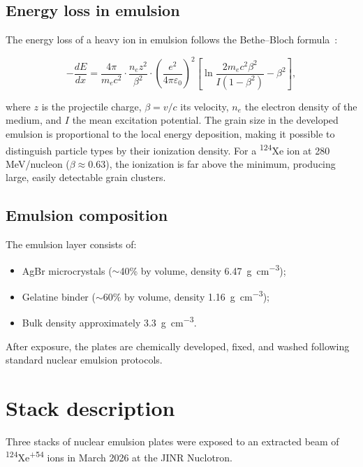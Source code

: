 \documentclass[12pt,a4paper]{article}
\begin{document}
\subsection{Energy loss in emulsion}

The energy loss of a heavy ion in emulsion follows the
Bethe--Bloch formula~\cite{bethe1930}:

\[
-\frac{dE}{dx} = \frac{4\pi}{m_e c^2}\cdot
\frac{n_e z^2}{\beta^2}\cdot
\left(\frac{e^2}{4\pi\varepsilon_0}\right)^{\!2}
\left[\ln\frac{2m_e c^2\beta^2}{I(1-\beta^2)} - \beta^2\right],
\]

\noindent where $z$ is the projectile charge, $\beta = v/c$ its
velocity, $n_e$ the electron density of the medium, and $I$ the mean
excitation potential. The grain size in the developed emulsion is
proportional to the local energy deposition, making it possible to
distinguish particle types by their ionization density. For a
\textsuperscript{124}Xe ion at 280\,MeV/nucleon ($\beta \approx 0.63$),
the ionization is far above the minimum, producing large, easily
detectable grain clusters.

\subsection{Emulsion composition}

The emulsion layer consists of:
\begin{itemize}
  \item AgBr microcrystals ($\sim$40\% by volume, density
        \SI{6.47}{\g\per\cm\cubed});
  \item Gelatine binder ($\sim$60\% by volume, density
        \SI{1.16}{\g\per\cm\cubed});
  \item Bulk density approximately \SI{3.3}{\g\per\cm\cubed}.
\end{itemize}

After exposure, the plates are chemically developed, fixed, and washed
following standard nuclear emulsion protocols.

\section{Stack description}
\label{sec:stack}

Three stacks of nuclear emulsion plates were exposed to an extracted
beam of \textsuperscript{124}Xe\textsuperscript{+54} ions in March 2026
at the JINR Nuclotron.
\end{document}
